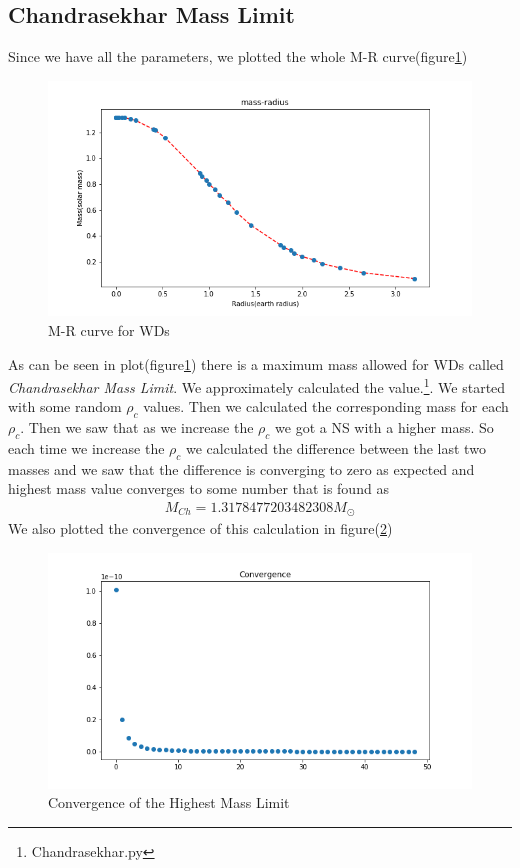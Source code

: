 \documentclass[aps,twocolumn,showpacs,preprintnumbers,nofootinbib,prl,superscriptaddress,groupedaddress]{revtex4-1}
\begin{document}
\subsection{Chandrasekhar Mass Limit}
Since we have all the parameters, we plotted the whole M-R curve(figure\ref{fig:full-m-r})
\begin{figure}
	\centering
	\includegraphics[width=1.0\linewidth]{"Figures/full M-R"}
	\caption{M-R curve for WDs}
	\label{fig:full-m-r}
\end{figure}
As can be seen in plot(figure\ref{fig:full-m-r}) there is a maximum mass allowed for WDs called \textit{Chandrasekhar Mass Limit}. We approximately calculated the value.\footnote{Chandrasekhar.py}. We started with some random $\rho_c$ values. Then we calculated the corresponding mass for each $\rho_c$. Then we saw that as we increase the $\rho_c$ we got a NS with a higher mass. So each time we increase the $\rho_c$ we calculated the difference between the last two masses and we saw that the difference is converging to zero as expected and highest mass value converges to some number that is found as
\begin{align}
	M_{Ch} =  1.3178477203482308 M_\odot
\end{align}
We also plotted the convergence of this calculation in figure(\ref{fig:convergence})
\begin{figure}
	\centering
	\includegraphics[width=1\linewidth]{Figures/convergence}
	\caption{Convergence of the Highest Mass Limit}
	\label{fig:convergence}
\end{figure}
\end{document}
